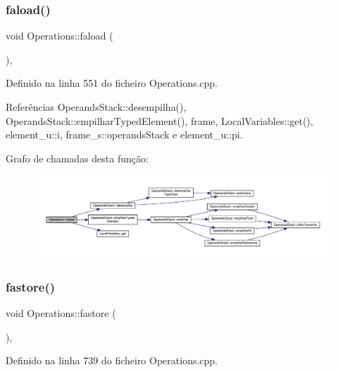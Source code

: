 \subsubsection{\texorpdfstring{faload()}{faload()}}
{\footnotesize\ttfamily void Operations\+::faload (\begin{DoxyParamCaption}{ }\end{DoxyParamCaption})\hspace{0.3cm}{\ttfamily [static]}, {\ttfamily [private]}}



Definido na linha 551 do ficheiro Operations.\+cpp.



Referências Operands\+Stack\+::desempilha(), Operands\+Stack\+::empilhar\+Typed\+Element(), frame, Local\+Variables\+::get(), element\+\_\+u\+::i, frame\+\_\+s\+::operands\+Stack e element\+\_\+u\+::pi.

Grafo de chamadas desta função\+:\nopagebreak
\begin{figure}[H]
\begin{center}
\leavevmode
\includegraphics[width=350pt]{classOperations_ac22c02d88fa894cafd3f53c54d91409d_cgraph}
\end{center}
\end{figure}
\mbox{\label{classOperations_aa8a2c3048379b9d5cdc2b4611ef86190}} 
\subsubsection{\texorpdfstring{fastore()}{fastore()}}
{\footnotesize\ttfamily void Operations\+::fastore (\begin{DoxyParamCaption}{ }\end{DoxyParamCaption})\hspace{0.3cm}{\ttfamily [static]}, {\ttfamily [private]}}



Definido na linha 739 do ficheiro Operations.\+cpp.



